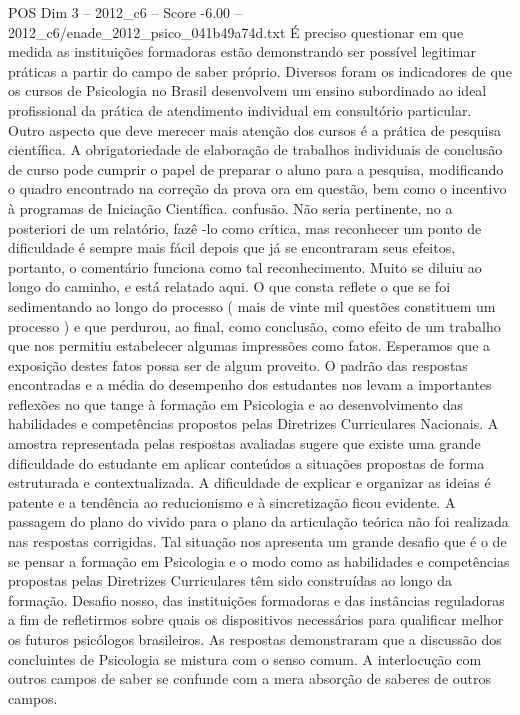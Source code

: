 \begin{textsample}{POS Dim 3 – 2012\_c6 – Score -6.00 – 2012\_c6/enade\_2012\_psico\_041b49a74d.txt}
É preciso questionar em que medida as instituições formadoras estão demonstrando ser possível legitimar práticas a partir do campo de saber próprio.
Diversos foram os indicadores de que os cursos de Psicologia no Brasil desenvolvem um ensino subordinado ao ideal profissional da prática de atendimento individual em consultório particular.
Outro aspecto que deve merecer mais atenção dos cursos é a prática de pesquisa científica.
A obrigatoriedade de elaboração de trabalhos individuais de conclusão de curso pode cumprir o papel de preparar o aluno para a pesquisa, modificando o quadro encontrado na correção da prova ora em questão, bem como o incentivo à programas de Iniciação Científica. confusão.
Não seria pertinente, no a posteriori de um relatório, fazê -lo como crítica, mas reconhecer um ponto de dificuldade é sempre mais fácil depois que já se encontraram seus efeitos, portanto, o comentário funciona como tal reconhecimento.
Muito se diluiu ao longo do caminho, e está relatado aqui.
O que consta reflete o que se foi sedimentando ao longo do processo ( mais de vinte mil questões constituem um processo ) e que perdurou, ao final, como conclusão, como efeito de um trabalho que nos permitiu estabelecer algumas impressões como fatos.
Esperamos que a exposição destes fatos possa ser de algum proveito.
O padrão das respostas encontradas e a média do desempenho dos estudantes nos levam a importantes reflexões no que tange à formação em Psicologia e ao desenvolvimento das habilidades e competências propostos pelas Diretrizes Curriculares Nacionais.
A amostra representada pelas respostas avaliadas sugere que existe uma grande dificuldade do estudante em aplicar conteúdos a situações propostas de forma estruturada e contextualizada.
A dificuldade de explicar e organizar as ideias é patente e a tendência ao reducionismo e à sincretização ficou evidente.
A passagem do plano do vivido para o plano da articulação teórica não foi realizada nas respostas corrigidas.
Tal situação nos apresenta um grande desafio que é o de se pensar a formação em Psicologia e o modo como as habilidades e competências propostas pelas Diretrizes Curriculares têm sido construídas ao longo da formação.
Desafio nosso, das instituições formadoras e das instâncias reguladoras a fim de refletirmos sobre quais os dispositivos necessários para qualificar melhor os futuros psicólogos brasileiros.
As respostas demonstraram que a discussão dos concluintes de Psicologia se mistura com o senso comum.
A interlocução com outros campos de saber se confunde com a mera absorção de saberes de outros campos.

\end{textsample}
